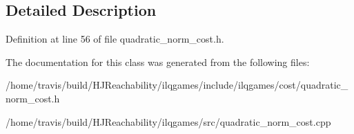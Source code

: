 \subsection{Detailed Description}


Definition at line 56 of file quadratic\+\_\+norm\+\_\+cost.\+h.



The documentation for this class was generated from the following files\+:\begin{DoxyCompactItemize}
\item 
/home/travis/build/\+H\+J\+Reachability/ilqgames/include/ilqgames/cost/quadratic\+\_\+norm\+\_\+cost.\+h\item 
/home/travis/build/\+H\+J\+Reachability/ilqgames/src/quadratic\+\_\+norm\+\_\+cost.\+cpp\end{DoxyCompactItemize}
